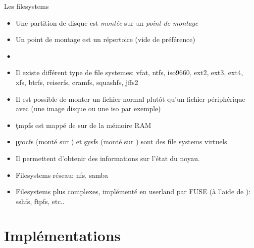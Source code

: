 \begin{frame}[fragile=singleslide]{Les filesystems}
  \begin{itemize}
  \item Une  partition de disque est \emph{montée}  sur un \emph{point
      de montage}
  \item Un point de montage est un répertoire (vide de préférence)
  \item {}  
  \item  Il  existe  différent  type  de file  systemes:  vfat,  ntfs,
    iso9660, ext2, ext3, ext4, xfs, btrfs, reiserfs, cramfs, squashfs,
    jffs2
  \item  Il est  possible de  monter  un fichier  normal plutôt  qu'un
    fichier périphérique  avec  (une image  disque ou une
    iso par exemple)
  \item \c{tmpfs} est mappé de sur de la mémoire RAM
  \item \c{procfs}  (monté sur  ) et \c{sysfs}  (monté sur
    ) sont des file systems virtuels
  \item Il permettent d'obtenir des informations sur l'état du noyau.
  \item Filesystems réseau: nfs, samba
  \item Filesystems plus complexes, implémenté en userland par FUSE (à
    l'aide de ): sshfs, ftpfs, etc..
  \end{itemize}
\end{frame}

\section{Implémentations}

